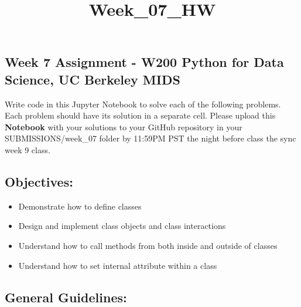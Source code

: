 \documentclass[11pt]{article}
\title{Week\_07\_HW}
\providecommand{\tightlist}{%
      \setlength{\itemsep}{0pt}\setlength{\parskip}{0pt}}
\begin{document}
    
    
    \maketitle
    
    

    
    \subsection{Week 7 Assignment - W200 Python for Data Science, UC
Berkeley
MIDS}\label{week-7-assignment---w200-python-for-data-science-uc-berkeley-mids}

Write code in this Jupyter Notebook to solve each of the following
problems. Each problem should have its solution in a separate cell.
Please upload this \textbf{Notebook} with your solutions to your GitHub
repository in your SUBMISSIONS/week\_07 folder by 11:59PM PST the night
before class the sync week 9 class.

    \subsection{Objectives:}\label{objectives}

\begin{itemize}
\tightlist
\item
  Demonstrate how to define classes
\item
  Design and implement class objects and class interactions
\item
  Understand how to call methods from both inside and outside of classes
\item
  Understand how to set internal attribute within a class
\end{itemize}

    \subsection{General Guidelines:}\label{general-guidelines}
\end{document}
